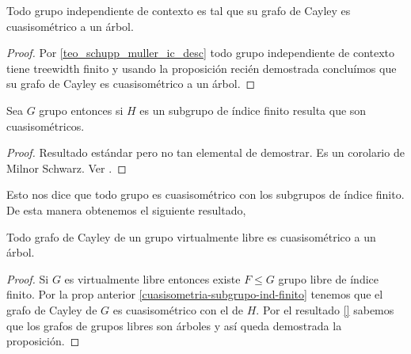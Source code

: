 \documentclass[tesis.tex]{subfiles}
\begin{document}
\begin{coro}
	Todo grupo independiente de contexto es tal que su grafo de Cayley es cuasisométrico a un árbol.
\end{coro}
\begin{proof}
	Por \ref{teo_schupp_muller_ic_desc} todo grupo independiente de contexto tiene treewidth finito y usando la proposición recién demostrada concluímos que su grafo de Cayley es cuasisométrico a un árbol.
\end{proof}


\begin{prop}\label{cuasisometria-subgrupo-ind-finito}
	Sea $G$ grupo \fg entonces si $H$ es un subgrupo de índice finito resulta que son cuasisométricos.
\end{prop}
\begin{proof}
	Resultado estándar pero no tan elemental de demostrar. 
	Es un corolario de Milnor Schwarz.
	Ver \cite{loh2017geometric}.
\end{proof}

Esto nos dice que todo grupo es cuasisométrico con los subgrupos de índice finito. 
De esta manera obtenemos el siguiente resultado,

\begin{prop}
	Todo grafo de Cayley de un grupo virtualmente libre es cuasisométrico a un árbol.
\end{prop}

\begin{proof}
	Si $G$ es virtualmente libre entonces existe $F \le G$ grupo libre de índice finito.
	Por la prop anterior \ref{cuasisometria-subgrupo-ind-finito} tenemos que el grafo de Cayley de $G$ es cuasisométrico con el de $H$.
	Por el resultado \ref{} sabemos que los grafos de grupos libres son árboles y así queda demostrada la proposición.
\end{proof}

	
	
\end{document}
